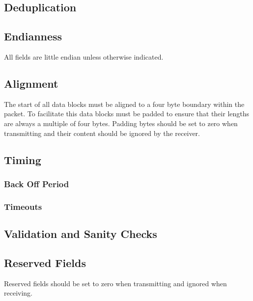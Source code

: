 \subsection {Deduplication}
\label{subsec:other-considerations_deduplication}

\subsection{Endianness}

All fields are little endian unless otherwise indicated.

\subsection{Alignment}

The start of all data blocks must be aligned to a four byte boundary within the packet. To facilitate this data blocks
must be padded to ensure that their lengths are always a multiple of four bytes. Padding bytes should be set to zero
when transmitting and their content should be ignored by the receiver.

\subsection{Timing}

\subsubsection{Back Off Period}

\subsubsection{Timeouts}

\subsection{Validation and Sanity Checks}

\subsection{Reserved Fields}

Reserved fields should be set to zero when transmitting and ignored when receiving.

